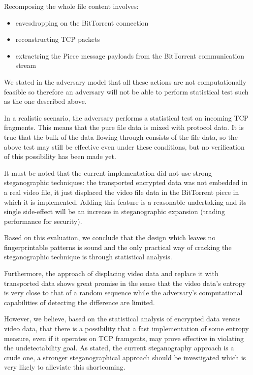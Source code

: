\documentclass[11pt]{article} %
\begin{document}
Recomposing the whole file content involves:
\begin{itemize}
\item eavesdropping on the BitTorrent connection
\item reconstructing TCP packets
\item extractring the Piece message payloads from the BitTorrent communication stream
\end{itemize}

We stated in the adversary model that all these actions are not computationally feasible so therefore an adversary will not be able to perform statistical test such as the one described above.

In a realistic scenario, the adversary performs a statistical test on incoming TCP fragments. This means that the pure file data is mixed with protocol data. It is true that the bulk of the data flowing through consists of the file data, so the above test may still be effective even under these conditions, but no verification of this possibility has been made yet.

It must be noted that the current implementation did not use strong steganographic techniques: the transported encrypted data was not embedded in a real video file, it just displaced the video file data in the BitTorrent piece in which it is implemented. Adding this feature is a reasonable undertaking and its single side-effect will be an increase in steganographic expansion (trading performance for security).

Based on this evaluation, we conclude that the design which leaves no fingerprintable patterns is sound and the only practical way of cracking the steganographic technique is through statistical analysis.

Furthermore, the approach of displacing video data and replace it with transported data shows great promise in the sense that the video data's entropy is very close to that of a random sequence while the adversary's computational capabilities of detecting the difference are limited.

However, we believe, based on the statistical analysis of encrypted data versus video data, that there is a possibility that a fast implementation of some entropy measure, even if it operates on TCP framgents, may prove effective in violating the undetectability goal. As stated, the current steganography approach is a crude one, a stronger steganographical approach should be investigated which is very likely to alleviate this shortcoming.
\end{document}
